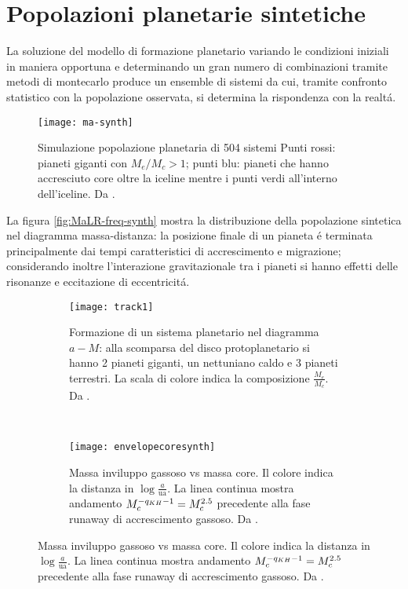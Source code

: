 \section{Popolazioni planetarie sintetiche}
La soluzione del modello di formazione planetario variando le condizioni iniziali in maniera opportuna e determinando un gran numero di combinazioni tramite metodi di montecarlo produce un ensemble di sistemi da cui, tramite confronto statistico con la popolazione osservata,  si determina la rispondenza con la realt\'a.

\begin{figure}[!ht]
\texttt{[image: ma-synth]}\label{fig:ma-synth}
\caption{Simulazione popolazione planetaria di 504 sistemi Punti rossi: pianeti giganti con $M_e/M_c>1$; punti blu: pianeti che hanno accresciuto core oltre la iceline mentre i punti verdi all'interno dell'iceline. Da \cite{mordasini2018planetary}.}
\end{figure}

La figura \ref{fig:MaLR-freq-synth} mostra la distribuzione della popolazione sintetica nel diagramma massa-distanza: la posizione finale di un pianeta \'e terminata principalmente dai tempi caratteristici di accrescimento e migrazione; considerando inoltre l'interazione gravitazionale tra i pianeti si hanno effetti delle risonanze e eccitazione di eccentricit\'a.

\begin{figure}[!ht]
\begin{subfigure}[b]{0.47\textwidth}
\centering
\texttt{[image: track1]}
\caption{Formazione di un sistema planetario nel diagramma $a-M$: alla scomparsa del disco protoplanetario si hanno 2 pianeti giganti, un nettuniano caldo e 3 pianeti terrestri. La scala di colore indica la composizione $\frac{M_e}{M_c}$. Da \cite{mordasini2018planetary}.}\label{fig:track1}
\end{subfigure}
~
\begin{subfigure}[b]{0.47\textwidth}
\centering
\texttt{[image: envelopecoresynth]}
\caption{Massa inviluppo gassoso vs massa core. Il colore indica la distanza in $\log{\frac{a}{\si{\astronomicalunit}}}$. La linea continua mostra andamento $M_c^{-q_{KH}-1}=M_c^{2.5}$ precedente alla fase runaway di accrescimento gassoso. Da \cite{mordasini2018planetary}. }
\end{subfigure}
\end{figure}

